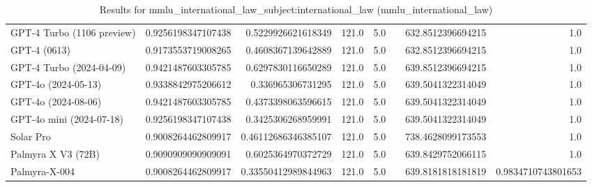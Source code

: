 \begin{table}[htp]
{\begin{tabular}{lrrrrrrr}
GPT-4 Turbo (1106 preview) & 0.9256198347107438 & 0.5229926621618349 & 121.0 & 5.0 &  & 632.8512396694215 & 1.0 \\
GPT-4 (0613) & 0.9173553719008265 & 0.4608367139642889 & 121.0 & 5.0 &  & 632.8512396694215 & 1.0 \\
GPT-4 Turbo (2024-04-09) & 0.9421487603305785 & 0.6297830116650289 & 121.0 & 5.0 &  & 639.8512396694215 & 1.0 \\
GPT-4o (2024-05-13) & 0.9338842975206612 & 0.336965306731295 & 121.0 & 5.0 &  & 639.5041322314049 & 1.0 \\
GPT-4o (2024-08-06) & 0.9421487603305785 & 0.4373398063596615 & 121.0 & 5.0 &  & 639.5041322314049 & 1.0 \\
GPT-4o mini (2024-07-18) & 0.9256198347107438 & 0.3425306268959991 & 121.0 & 5.0 &  & 639.5041322314049 & 1.0 \\
Solar Pro & 0.9008264462809917 & 0.46112686346385107 & 121.0 & 5.0 &  & 738.4628099173553 & 1.0 \\
Palmyra X V3 (72B) & 0.9090909090909091 & 0.6025364970372729 & 121.0 & 5.0 &  & 639.8429752066115 & 1.0 \\
Palmyra-X-004 & 0.9008264462809917 & 0.33550412989844963 & 121.0 & 5.0 &  & 639.8181818181819 & 0.9834710743801653 \\
\bottomrule
\end{tabular}}
\caption{Results for mmlu_international_law_subject:international_law (mmlu_international_law)}
\label{fig:mmlu_international_law_subject:international_law (mmlu_international_law)}
\end{table}